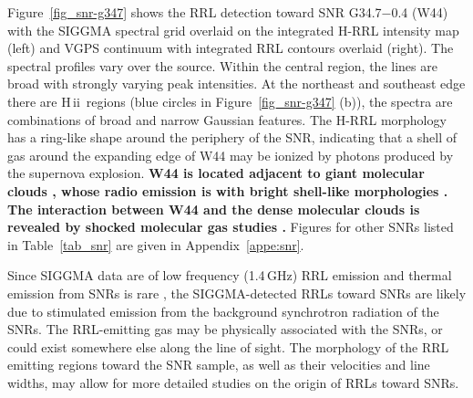 \documentclass[manuscript]{aastex61}
\newcommand{\hii}{{\rm H\,}{{\sc ii}}}
\newcommand{\ghz}{\,GHz}
\begin{document}
Figure~\ref{fig_snr-g347} shows the RRL detection toward SNR G34.7$-$0.4 (W44) with the SIGGMA spectral grid overlaid on the integrated H-RRL intensity map (left) and VGPS continuum with integrated RRL contours overlaid (right).
The spectral profiles vary over the source.
Within the central region, the lines are broad with strongly varying peak intensities.
At the northeast and southeast edge there are \hii\ regions (blue circles in Figure~\ref{fig_snr-g347} (b)), the spectra are combinations of broad and narrow Gaussian features.
The H-RRL morphology has a ring-like shape around the periphery of the SNR, indicating that a shell of gas around the expanding edge of W44 may be ionized by photons produced by the supernova explosion.
\textbf{W44 is located adjacent to giant molecular clouds \citep{Denoyer1983}, whose radio emission is with bright shell-like morphologies \citep{Jones1993}.
The interaction between W44 and the dense molecular clouds is revealed by shocked molecular gas studies \citep{Seta2004, Reach2005}. }
Figures for other SNRs listed in Table~\ref{tab_snr} are given in Appendix~\ref{appe:snr}.

Since SIGGMA data are of low frequency (1.4\ghz) RRL emission and thermal emission from SNRs is rare \citep{Cruciani2016}, the SIGGMA-detected RRLs toward SNRs are likely due to stimulated emission from the background synchrotron radiation of the SNRs.
The RRL-emitting gas may be physically associated with the SNRs, or could exist somewhere else along the line of sight.
The morphology of the RRL emitting regions toward the SNR sample, as well as their velocities and line widths, may allow for more detailed studies on the origin of RRLs toward SNRs.
\end{document}
